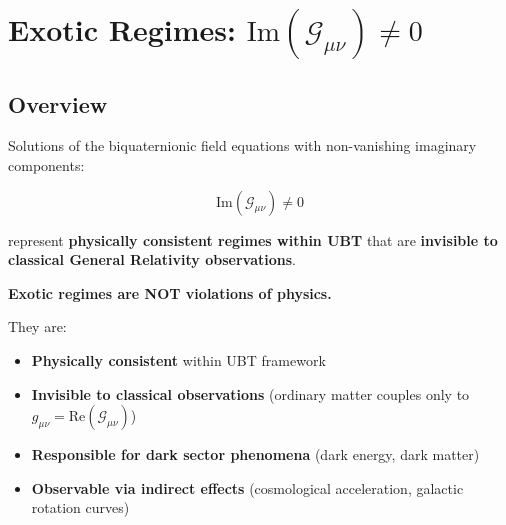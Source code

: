 

\section{Exotic Regimes: $\text{Im}(\mathcal{G}_{\mu\nu}) \neq 0$}
\label{sec:canonical:exotic_regimes}

\subsection{Overview}

Solutions of the biquaternionic field equations with non-vanishing imaginary components:

\begin{equation}
\text{Im}(\mathcal{G}_{\mu\nu}) \neq 0
\end{equation}

represent \textbf{physically consistent regimes within UBT} that are \textbf{invisible to classical General Relativity observations}.

\begin{tcolorbox}[colback=green!5!white,colframe=green!75!black,title=Physical Consistency]
\textbf{Exotic regimes are NOT violations of physics.}

They are:
\begin{itemize}
    \item \textbf{Physically consistent} within UBT framework
    \item \textbf{Invisible to classical observations} (ordinary matter couples only to $g_{\mu\nu} = \text{Re}(\mathcal{G}_{\mu\nu})$)
    \item \textbf{Responsible for dark sector phenomena} (dark energy, dark matter)
    \item \textbf{Observable via indirect effects} (cosmological acceleration, galactic rotation curves)
\end{itemize}
\end{tcolorbox}

